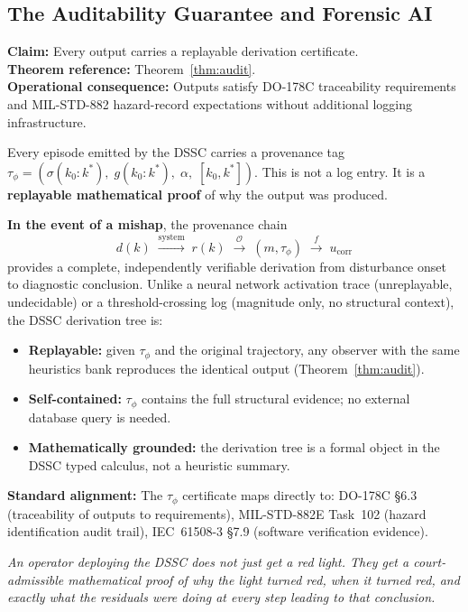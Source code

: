 \documentclass[11pt,a4paper]{article}
\theoremstyle{plain}
\theoremstyle{definition}
\theoremstyle{remark}
\newcommand{\Obs}{\mathcal{O}}
\begin{document}
\subsection{The Auditability Guarantee and Forensic AI}

\textbf{Claim:} Every output carries a replayable derivation certificate. \\
\textbf{Theorem reference:} Theorem~\ref{thm:audit}. \\
\textbf{Operational consequence:} Outputs satisfy DO-178C traceability requirements and
MIL-STD-882 hazard-record expectations without additional logging infrastructure.

\begin{tcolorbox}[colback=gray!5, colframe=gray!55, boxrule=0.5pt, arc=3pt,
  left=7pt, right=7pt, top=5pt, bottom=5pt,
  title={\textbf{The Provenance Tag as a Legal Asset: ``Forensic AI''}},
  fonttitle=\small\bfseries, coltitle=black]
Every episode emitted by the DSSC carries a provenance tag
$\tau_\phi = (\sigma(k_0{:}k^*),\; g(k_0{:}k^*),\; \alpha,\; [k_0, k^*])$.
This is not a log entry. It is a \textbf{replayable mathematical proof} of why the output
was produced.

\medskip
\textbf{In the event of a mishap}, the provenance chain
\[
  d(k) \;\xrightarrow{\text{system}}\; r(k)
  \;\xrightarrow{\Obs}\; (m, \tau_\phi)
  \;\xrightarrow{f}\; u_{\text{corr}}
\]
provides a complete, independently verifiable derivation from disturbance onset to
diagnostic conclusion. Unlike a neural network activation trace (unreplayable, undecidable)
or a threshold-crossing log (magnitude only, no structural context), the DSSC derivation
tree is:
\begin{itemize}[nosep,leftmargin=1.2em]
  \item \textbf{Replayable:} given $\tau_\phi$ and the original trajectory, any observer
    with the same heuristics bank reproduces the identical output (Theorem~\ref{thm:audit}).
  \item \textbf{Self-contained:} $\tau_\phi$ contains the full structural evidence; no
    external database query is needed.
  \item \textbf{Mathematically grounded:} the derivation tree is a formal object in the
    DSSC typed calculus, not a heuristic summary.
\end{itemize}

\medskip
\textbf{Standard alignment:} The $\tau_\phi$ certificate maps directly to:
DO-178C \S6.3 (traceability of outputs to requirements),
MIL-STD-882E Task~102 (hazard identification audit trail),
IEC~61508-3 \S7.9 (software verification evidence).

\medskip
\noindent\textit{An operator deploying the DSSC does not just get a red light. They get a
court-admissible mathematical proof of why the light turned red, when it turned red, and
exactly what the residuals were doing at every step leading to that conclusion.}
\end{tcolorbox}
\end{document}
